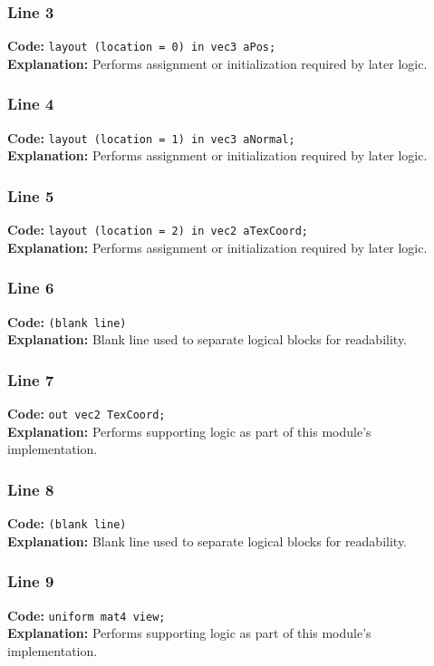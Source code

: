 \documentclass[11pt,a4paper]{article}
\begin{document}
\subsubsection*{Line 3}
\textbf{Code:} \verb|layout (location = 0) in vec3 aPos;|\\
\textbf{Explanation:} Performs assignment or initialization required by later logic.

\subsubsection*{Line 4}
\textbf{Code:} \verb|layout (location = 1) in vec3 aNormal;|\\
\textbf{Explanation:} Performs assignment or initialization required by later logic.

\subsubsection*{Line 5}
\textbf{Code:} \verb|layout (location = 2) in vec2 aTexCoord;|\\
\textbf{Explanation:} Performs assignment or initialization required by later logic.

\subsubsection*{Line 6}
\textbf{Code:} \texttt{(blank line)}\\
\textbf{Explanation:} Blank line used to separate logical blocks for readability.

\subsubsection*{Line 7}
\textbf{Code:} \verb|out vec2 TexCoord;|\\
\textbf{Explanation:} Performs supporting logic as part of this module's implementation.

\subsubsection*{Line 8}
\textbf{Code:} \texttt{(blank line)}\\
\textbf{Explanation:} Blank line used to separate logical blocks for readability.

\subsubsection*{Line 9}
\textbf{Code:} \verb|uniform mat4 view;|\\
\textbf{Explanation:} Performs supporting logic as part of this module's implementation.
\end{document}
